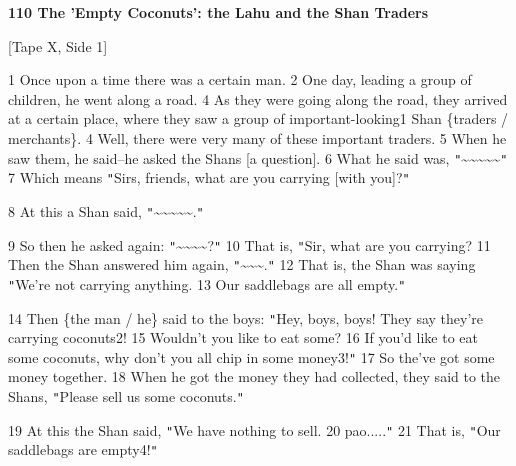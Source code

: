 
\textbf{110 The 'Empty Coconuts': the Lahu and the Shan Traders}

[Tape X, Side 1]

1 Once upon a time there was a certain man. 2 One day, leading a group of children,
he went along a road. 4 As they were going along the road, they arrived at a certain
place, where they saw a group of important-looking1 Shan \{traders / merchants\}.
4 Well, there were very many of these important traders. 5 When he saw them, he
said--he asked the Shans [a question]. 6 What he said was, \texttt{"}\textasciitilde{}\textasciitilde{}\textasciitilde{}\textasciitilde{}\textasciitilde{}\texttt{"}
7 Which means \texttt{"}Sirs, friends, what are you carrying [with you]?\texttt{"}

8 At this a Shan said, \texttt{"}\textasciitilde{}\textasciitilde{}\textasciitilde{}\textasciitilde{}\textasciitilde{}.\texttt{"}

9 So then he asked again: \texttt{"}\textasciitilde{}\textasciitilde{}\textasciitilde{}\textasciitilde{}?\texttt{"}
10 That is, \texttt{"}Sir, what are you carrying? 11 Then the Shan answered him
again, \texttt{"}\textasciitilde{}\textasciitilde{}\textasciitilde{}.\texttt{"}
12 That is, the Shan was saying \texttt{"}We're not carrying anything. 13 Our saddlebags
are all empty.\texttt{"}

14 Then \{the man / he\} said to the boys: \texttt{"}Hey, boys, boys! They say
they're carrying coconuts2! 15 Wouldn't you like to eat some? 16 If you'd like
to eat some coconuts, why don't you all chip in some money3!\texttt{"} 17 So the've
got some money together. 18 When he got the money they had collected, they said
to the Shans, \texttt{"}Please sell us some coconuts.\texttt{"}

19 At this the Shan said, \texttt{"}We have nothing to sell. 20 pao.....\texttt{"}
21 That is, \texttt{"}Our saddlebags are empty4!\texttt{"}

